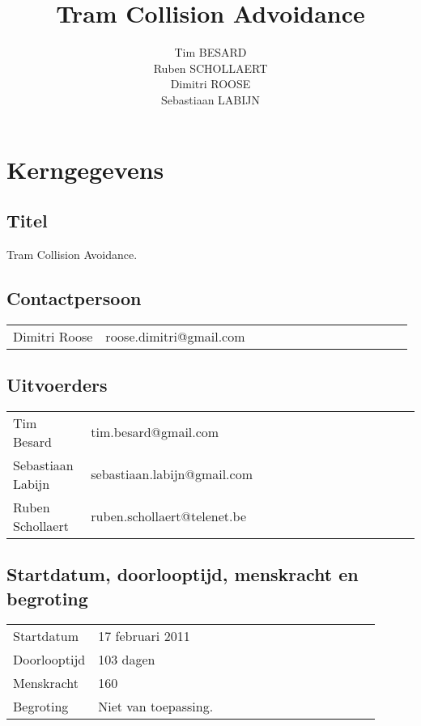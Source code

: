 \documentclass[a4paper,oneside,11pt,final]{memoir}
\title{Tram Collision Advoidance}
\author{Tim BESARD\\Ruben SCHOLLAERT\\Dimitri ROOSE\\Sebastiaan LABIJN}
\begin{document}
\maketitle

\section{Kerngegevens}\label{sec:kerngegevens}

\subsection{Titel}\label{sec:Titel}

Tram Collision Avoidance.

\subsection{Contactpersoon} \label{sec:Contactpersoon}

\begin{table}[h]
		\begin{tabular}{*{14}{l}}
		Dimitri Roose & roose.dimitri@gmail.com \\
		\end{tabular}
\end{table}

\subsection{Uitvoerders}\label{sec:Uitvoerders}

\begin{table}[h]
		\begin{tabular}{*{14}{l}}
		Tim Besard & tim.besard@gmail.com \\
		Sebastiaan Labijn & sebastiaan.labijn@gmail.com \\
		Ruben Schollaert & ruben.schollaert@telenet.be \\	
		\end{tabular}
\end{table}

\subsection{Startdatum, doorlooptijd, menskracht en begroting}\label{sec:Startdatum}
\begin{table}[h]
		\begin{tabular}{*{14}{l}}
		Startdatum & 17 februari 2011 \\
		Doorlooptijd & 103 dagen\\
		Menskracht & 160\\	
		Begroting & Niet van toepassing.\\
		\end{tabular}
\end{table}
\end{document}
